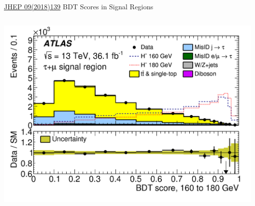 \documentclass[aspectratio=169,xcolor=table]{beamer}
\begin{document}
\begin{frame}{\href{https://link.springer.com/article/10.1007/JHEP09(2018)139}{JHEP 09(2018)139} BDT Scores in Signal Regions}
\begin{columns}
        \includegraphics[height=.24\textheight,keepaspectratio=true]{taumu_SR_2018/taumu_SR_160to180_2018.png}



\end{columns}
\end{frame}
\end{document}
